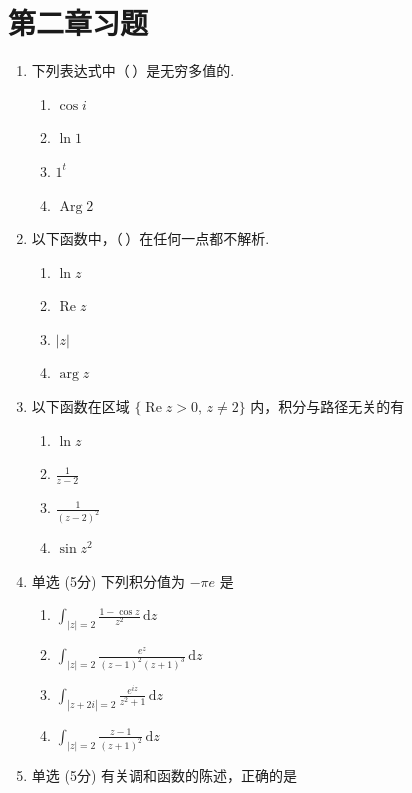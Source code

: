 \documentclass[openany,oneside]{ctexbook}
\begin{document}
\section{第二章习题}
\begin{enumerate}
    \item 下列表达式中（\,）是无穷多值的.
\begin{enumerate}[label=\Alph*.]
\item $\cos i$
\item $\ln 1$
\item $1^t$
\item $\operatorname{Arg} 2$
\end{enumerate}

\item 以下函数中，（\,）在任何一点都不解析.
\begin{enumerate}[label=\Alph*.]
\item $\ln z$
\item $\operatorname{Re} z$
\item $|z|$
\item $\arg z$
\end{enumerate}

\item 以下函数在区域 \(\{\operatorname{Re} z > 0, \, z \neq 2\}\) 内，积分与路径无关的有
\begin{enumerate}[label=\Alph*.]
\item $\ln z$
\item $\frac{1}{z - 2}$
\item $\frac{1}{(z - 2)^2}$
\item $\sin z^2$
\end{enumerate}
\item 单选 (5分) 下列积分值为 \(-\pi e\) 是

\begin{enumerate}[label=\Alph*.]
\item \(\displaystyle \int_{|z|=2} \frac{1 - \cos z}{z^2} \, \mathrm{d}z\)
\item \(\displaystyle \int_{|z|=2} \frac{e^z}{(z-1)^2(z+1)^3} \, \mathrm{d}z\)
\item \(\displaystyle \int_{|z+2i|=2} \frac{e^{iz}}{z^2 + 1} \, \mathrm{d}z\)
\item \(\displaystyle \int_{|z|=2} \frac{z-1}{(z+1)^2} \, \mathrm{d}z\)
\end{enumerate}

\item 单选 (5分) 有关调和函数的陈述，正确的是


\end{enumerate}
\end{document}

